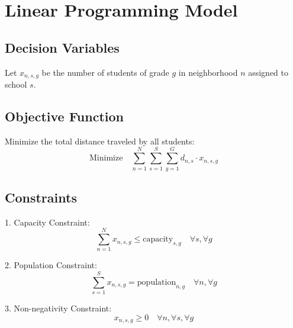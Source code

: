 \documentclass{article}
\begin{document}
\section*{Linear Programming Model}

\subsection*{Decision Variables}
Let \( x_{n,s,g} \) be the number of students of grade \( g \) in neighborhood \( n \) assigned to school \( s \).

\subsection*{Objective Function}
Minimize the total distance traveled by all students:
\[
\text{Minimize} \quad \sum_{n=1}^{N} \sum_{s=1}^{S} \sum_{g=1}^{G} d_{n,s} \cdot x_{n,s,g}
\]

\subsection*{Constraints}

1. Capacity Constraint:
\[
\sum_{n=1}^{N} x_{n,s,g} \leq \text{capacity}_{s,g} \quad \forall s, \forall g
\]

2. Population Constraint:
\[
\sum_{s=1}^{S} x_{n,s,g} = \text{population}_{n,g} \quad \forall n, \forall g
\]

3. Non-negativity Constraint:
\[
x_{n,s,g} \geq 0 \quad \forall n, \forall s, \forall g
\]
\end{document}
